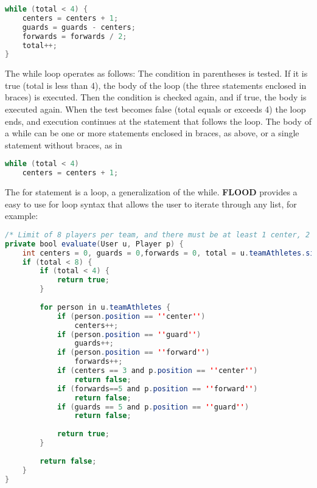 \documentclass[12pt]{report}
\begin{document}
\begin{lstlisting}[language=Java,label=some-code,caption=While loop]
while (total < 4) {
	centers = centers + 1;
	guards = guards - centers;
	forwards = forwards / 2;
	total++;
}
\end{lstlisting}

\begin{doublespace}
The while loop operates as follows: The condition in parentheses is tested. If it is true (total is less than 4), the body of the loop (the three statements enclosed in braces) is executed. Then the condition is checked again, and if true, the body is executed again. When the test becomes false (total equals or exceeds 4) the loop ends, and execution continues at the statement that follows the loop. The body of a while can be one or more statements enclosed in braces, as above, or a single statement without braces, as in
\end{doublespace}

\begin{lstlisting}[language=Java,label=some-code,caption=While loop]
while (total < 4)
	centers = centers + 1;
\end{lstlisting}

\begin{doublespace}
The for statement is a loop, a generalization of the while. \textbf{FLOOD} provides a easy to use for loop syntax that allows the user to iterate through any list, for example:
\end{doublespace}

\begin{lstlisting}[language=Java,label=some-code,caption=While loop]
/* Limit of 8 players per team, and there must be at least 1 center, 2 guards and 2 forwards per team. */
private bool evaluate(User u, Player p) {
	int centers = 0, guards = 0,forwards = 0, total = u.teamAthletes.size();
	if (total < 8) {
		if (total < 4) {
			return true;
		}
		
		for person in u.teamAthletes {
			if (person.position == ''center'')
				centers++;
			if (person.position == ''guard'')
				guards++;
			if (person.position == ''forward'')
				forwards++;
			if (centers == 3 and p.position == ''center'')
				return false;
			if (forwards==5 and p.position == ''forward'')
				return false;
			if (guards == 5 and p.position == ''guard'')
				return false;
		
			return true;
		}
		
		return false;
	}
}
\end{lstlisting}
\end{document}
